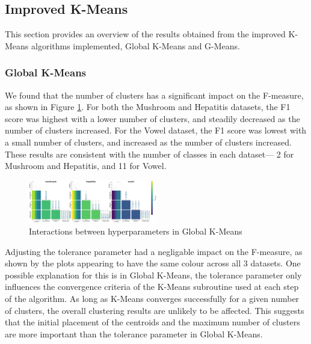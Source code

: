 \subsection{Improved K-Means}
\label{subsec:improvedkmeansresults}

This section provides an overview of the results obtained from the improved K-Means algorithms implemented, Global K-Means and G-Means.

\subsubsection{Global K-Means}
\label{subsec:globalkmeansresults}

We found that the number of clusters has a significant impact on the F-measure,
as shown in Figure \ref{fig:interactions-global-kmeans}. For both the Mushroom and Hepatitis datasets, the F1 score was
highest with a lower number of clusters, and steadily decreased as the number of clusters increased. For the Vowel dataset, the F1 score was lowest 
with a small number of clusters, and increased as the number of clusters increased. These results are consistent with the number of classes in each
dataset— 2 for Mushroom and Hepatitis, and 11 for Vowel.

\begin{figure}[h!]
    \centering
    \includegraphics[width=0.5\textwidth]{figures/interactions_global_kmeans.png}
    \caption{Interactions between hyperparameters in Global K-Means}
    \label{fig:interactions-global-kmeans}
\end{figure}

Adjusting the tolerance parameter had a negligable impact on the F-measure, as shown by the plots appearing to have the same colour across
all 3 datasets. One possible explanation for this is in Global K-Means, the tolerance parameter only influences the convergence criteria
of the K-Means subroutine used at each step of the algorithm. As long as K-Means converges successfully for a given number of clusters, the
overall clustering results are unlikely to be affected. This suggests that the initial placement of the centroids and
the maximum number of clusters are more important than the tolerance parameter in Global K-Means.


